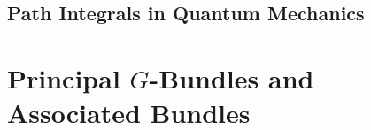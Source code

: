 \documentclass[11pt]{article}
\begin{document}





\vskip 0.5cm
\subsection{Path Integrals in Quantum Mechanics}









\newpage
\section{Principal $G$-Bundles and Associated Bundles}
\end{document}

